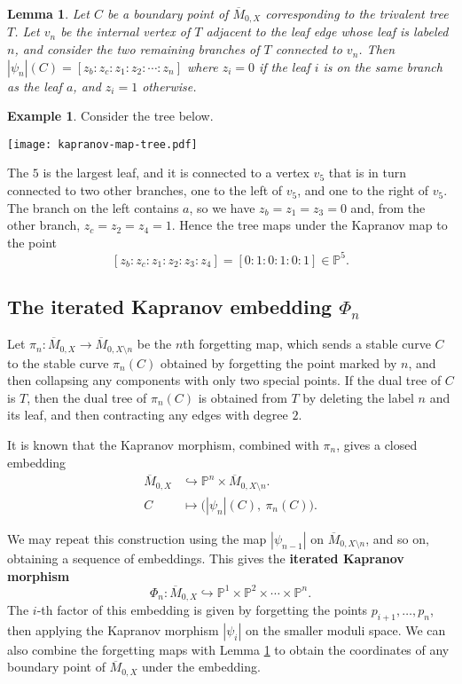 \documentclass[11pt]{amsart}
\newcommand{\Mbar}{\overline{M}}
\newcommand{\emb}{\Phi}
\newcommand{\kapn}{|\psi_n|}
\newtheorem{lemma}[thm]{Lemma}
\numberwithin{thm}{section}
\numberwithin{equation}{section}
\numberwithin{figure}{section}
\theoremstyle{definition}
\newtheorem{example}[thm]{Example}
\begin{document}
\begin{lemma}\label{lem:coordinates}
  Let $C$ be a boundary point of $\Mbar_{0,X}$ corresponding to the trivalent tree $T$.  Let $v_n$ be the internal vertex of $T$ adjacent to the leaf edge whose leaf is labeled $n$, and consider the two remaining branches of $T$ connected to $v_n$.  Then $\kapn(C)=[z_b:z_c:z_1:z_2:\cdots:z_n]$ where $z_i=0$ if the leaf $i$ is on the same branch as the leaf $a$, and $z_i=1$ otherwise. 
\end{lemma}


\begin{example}
 Consider the tree below.
 \begin{center}
     \texttt{[image: kapranov-map-tree.pdf]}
 \end{center}
 The $5$ is the largest leaf, and it is connected to a vertex $v_5$ that is in turn connected to two other branches, one to the left of $v_5$, and one to the right of $v_5$.  The branch on the left contains $a$, so we have $z_b = z_1 = z_3 = 0$ and, from the other branch, $z_c = z_2 = z_4 = 1$.  Hence the tree maps under the Kapranov map to the point $$[z_b:z_c:z_1:z_2:z_3:z_4]=[0:1:0:1:0:1] \in \mathbb{P}^5.$$
\end{example}


\subsection{The iterated Kapranov embedding $\emb_n$}\label{sec:background-embedding}

Let $\pi_n : \Mbar_{0,X}\to \Mbar_{0,X\setminus n}$ be the $n$th forgetting map, which sends a stable curve $C$ to the stable curve $\pi_n(C)$ obtained by forgetting the point marked by $n$, and then collapsing any components with only two special points. If the dual tree of $C$ is $T$, then the dual tree of $\pi_n(C)$ is obtained from $T$ by deleting the label $n$ and its leaf, and then contracting any edges with degree $2$.

It is known that the Kapranov morphism, combined with $\pi_n$, gives a closed embedding
\begin{align*}
\Mbar_{0, X} &\hookrightarrow \mathbb{P}^n \times \Mbar_{0, X\setminus n}. \\
C &\mapsto \big( \kapn(C), \ \pi_n(C) \big).
\end{align*}

We may repeat this construction using the map $|\psi_{n-1}|$ on $\Mbar_{0, X\setminus n}$, and so on, obtaining a sequence of embeddings. This gives the {\bf iterated Kapranov morphism}
\[\emb_n: \Mbar_{0,X} \hookrightarrow \mathbb{P}^1 \times \mathbb{P}^2 \times \cdots \times \mathbb{P}^n.\]
The $i$-th factor of this embedding is given by forgetting the points $p_{i+1}, \ldots, p_n$, then applying the Kapranov morphism $|\psi_i|$ on the smaller moduli space. We can also combine the forgetting maps with Lemma \ref{lem:coordinates} to obtain the coordinates of any boundary point of $\Mbar_{0,X}$ under the embedding.
\end{document}
